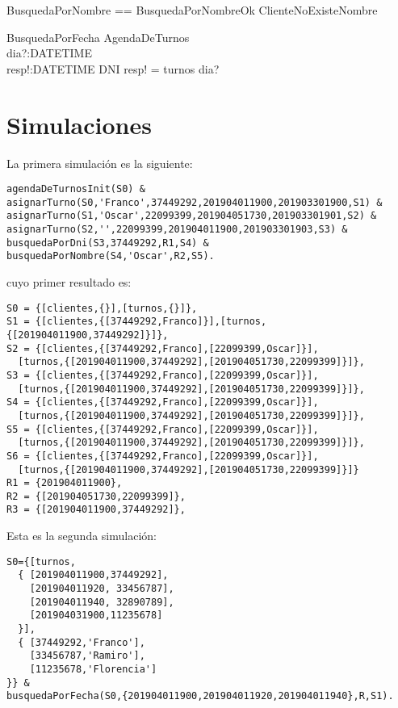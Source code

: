 \documentclass[%
  fleqn,colorlinks,linkcolor=blue,citecolor=blue,urlcolor=blue]{eptcs}
\begin{document}
  \begin{zed}
  BusquedaPorNombre == BusquedaPorNombreOk \lor ClienteNoExisteNombre
  \end{zed}

  \begin{schema}{BusquedaPorFecha}
  \Xi AgendaDeTurnos \\
  dia?:\power DATETIME \\
  resp!:DATETIME \pfun DNI
  \where
  resp! = turnos \rres dia?
  \end{schema}

\section{Simulaciones}

La primera simulaci\'on es la siguiente:

\begin{verbatim}
agendaDeTurnosInit(S0) &
asignarTurno(S0,'Franco',37449292,201904011900,201903301900,S1) &
asignarTurno(S1,'Oscar',22099399,201904051730,201903301901,S2) &
asignarTurno(S2,'',22099399,201904011900,201903301903,S3) &
busquedaPorDni(S3,37449292,R1,S4) & busquedaPorNombre(S4,'Oscar',R2,S5).
\end{verbatim}
cuyo primer resultado es:
\begin{verbatim}
S0 = {[clientes,{}],[turnos,{}]},
S1 = {[clientes,{[37449292,Franco]}],[turnos,{[201904011900,37449292]}]},
S2 = {[clientes,{[37449292,Franco],[22099399,Oscar]}],
  [turnos,{[201904011900,37449292],[201904051730,22099399]}]},
S3 = {[clientes,{[37449292,Franco],[22099399,Oscar]}],
  [turnos,{[201904011900,37449292],[201904051730,22099399]}]},
S4 = {[clientes,{[37449292,Franco],[22099399,Oscar]}],
  [turnos,{[201904011900,37449292],[201904051730,22099399]}]},
S5 = {[clientes,{[37449292,Franco],[22099399,Oscar]}],
  [turnos,{[201904011900,37449292],[201904051730,22099399]}]},
S6 = {[clientes,{[37449292,Franco],[22099399,Oscar]}],
  [turnos,{[201904011900,37449292],[201904051730,22099399]}]}
R1 = {201904011900},
R2 = {[201904051730,22099399]},
R3 = {[201904011900,37449292]},
\end{verbatim}

Esta es la segunda simulaci\'on:

\begin{verbatim}
S0={[turnos,
  { [201904011900,37449292],
    [201904011920, 33456787],
    [201904011940, 32890789],
    [201904031900,11235678]
  }],
  { [37449292,'Franco'],
    [33456787,'Ramiro'],
    [11235678,'Florencia']
}} &
busquedaPorFecha(S0,{201904011900,201904011920,201904011940},R,S1).
\end{verbatim}
\end{document}
